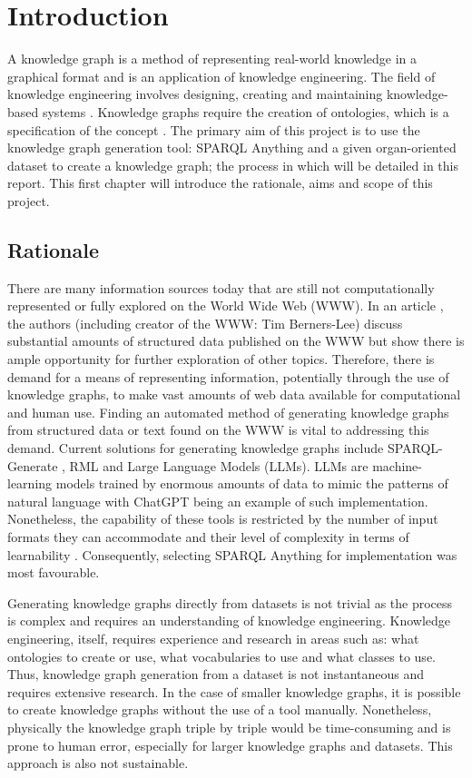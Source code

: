 \chapter{Introduction}
A knowledge graph is a method of representing real-world knowledge in a graphical format and is an application of knowledge engineering. The field of knowledge engineering involves designing, creating and maintaining knowledge-based systems \cite{studer_benjamins_fensel_1998}. Knowledge graphs require the creation of ontologies, which is a specification of the concept \cite{Breitman2007}. The primary aim of this project is to use the knowledge graph generation tool: SPARQL Anything and a given organ-oriented dataset to create a knowledge graph; the process in which will be detailed in this report. This first chapter will introduce the rationale, aims and scope of this project. 

\section{Rationale}
\hspace{0.5cm} There are many information sources today that are still not computationally represented or fully explored on the World Wide Web (WWW). In an article \cite{bizer2011linked}, the authors (including creator of the WWW: Tim Berners-Lee) discuss substantial amounts of structured data published on the WWW but show there is ample opportunity for further exploration of other topics. Therefore, there is demand for a means of representing information, potentially through the use of knowledge graphs, to make vast amounts of web data available for computational and human use. Finding an automated method of generating knowledge graphs from structured data or text found on the WWW is vital to addressing this demand. Current solutions for generating knowledge graphs include SPARQL-Generate \cite{sparqlgenerate}, RML \cite{rml} and Large Language Models (LLMs). LLMs are machine-learning models trained by enormous amounts of data to mimic the patterns of natural language with ChatGPT \cite{chatgptwebsite} being an example of such implementation. Nonetheless, the capability of these tools is restricted by the number of input formats they can accommodate and their level of complexity in terms of learnability \cite{sparqlanything}. Consequently, selecting SPARQL Anything \cite{sparqlanythinggithub} for implementation was most favourable. 

Generating knowledge graphs directly from datasets is not trivial as the process is complex and requires an understanding of knowledge engineering. Knowledge engineering, itself, requires experience and research in areas such as: what ontologies to create or use, what vocabularies to use and what classes to use. Thus, knowledge graph generation from a dataset is not instantaneous and requires extensive research. In the case of smaller knowledge graphs, it is possible to create knowledge graphs without the use of a tool manually. Nonetheless, physically the knowledge graph triple by triple would be time-consuming and is prone to human error, especially for larger knowledge graphs and datasets. This approach is also not sustainable. 

